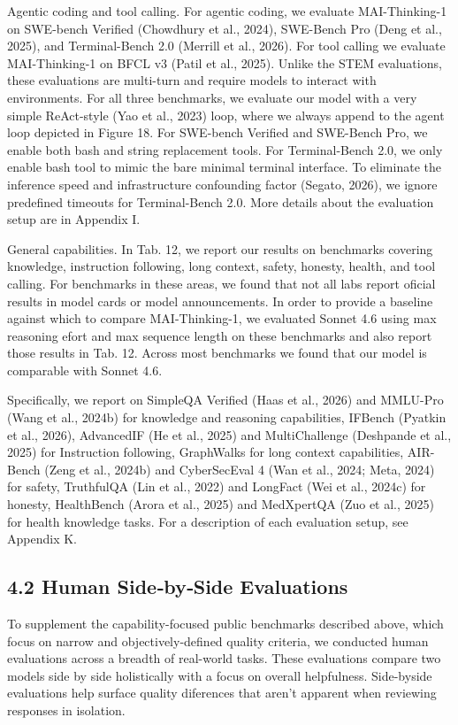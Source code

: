 \documentclass[
  10
]{article}
\begin{document}
Agentic coding and tool calling. For agentic coding, we evaluate
MAI-Thinking-1 on SWE-bench Verified (Chowdhury et al., 2024), SWE-Bench
Pro (Deng et al., 2025), and Terminal-Bench 2.0 (Merrill et al., 2026).
For tool calling we evaluate MAI-Thinking-1 on BFCL v3 (Patil et al.,
2025). Unlike the STEM evaluations, these evaluations are multi-turn and
require models to interact with environments. For all three benchmarks,
we evaluate our model with a very simple ReAct-style (Yao et al., 2023)
loop, where we always append to the agent loop depicted in Figure 18.
For SWE-bench Verified and SWE-Bench Pro, we enable both bash and string
replacement tools. For Terminal-Bench 2.0, we only enable bash tool to
mimic the bare minimal terminal interface. To eliminate the inference
speed and infrastructure confounding factor (Segato, 2026), we ignore
predefined timeouts for Terminal-Bench 2.0. More details about the
evaluation setup are in Appendix I.

General capabilities. In Tab. 12, we report our results on benchmarks
covering knowledge, instruction following, long context, safety,
honesty, health, and tool calling. For benchmarks in these areas, we
found that not all labs report oficial results in model cards or model
announcements. In order to provide a baseline against which to compare
MAI-Thinking-1, we evaluated Sonnet 4.6 using max reasoning efort and
max sequence length on these benchmarks and also report those results in
Tab. 12. Across most benchmarks we found that our model is comparable
with Sonnet 4.6.

Specifically, we report on SimpleQA Verified (Haas et al., 2026) and
MMLU-Pro (Wang et al., 2024b) for knowledge and reasoning capabilities,
IFBench (Pyatkin et al., 2026), AdvancedIF (He et al., 2025) and
MultiChallenge (Deshpande et al., 2025) for Instruction following,
GraphWalks for long context capabilities, AIR-Bench (Zeng et al., 2024b)
and CyberSecEval 4 (Wan et al., 2024; Meta, 2024) for safety, TruthfulQA
(Lin et al., 2022) and LongFact (Wei et al., 2024c) for honesty,
HealthBench (Arora et al., 2025) and MedXpertQA (Zuo et al., 2025) for
health knowledge tasks. For a description of each evaluation setup, see
Appendix K.

\subsection{4.2 Human Side‐by‐Side
Evaluations}\label{human-sidebyside-evaluations}

To supplement the capability-focused public benchmarks described above,
which focus on narrow and objectively-defined quality criteria, we
conducted human evaluations across a breadth of real-world tasks. These
evaluations compare two models side by side holistically with a focus on
overall helpfulness. Side-byside evaluations help surface quality
diferences that aren't apparent when reviewing responses in isolation.
\end{document}
